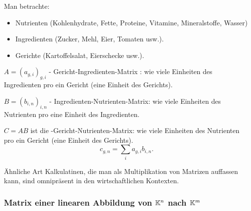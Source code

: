 \begin{bem} 
	Man betrachte: 
	\begin{itemize} 
		\item Nutrienten (Kohlenhydrate, Fette, Proteine, Vitamine, Mineralstoffe, Wasser)
		\item Ingredienten (Zucker, Mehl, Eier, Tomaten usw.). 
		\item Gerichte (Kartoffelsalat, Eierschecke usw.). 
	\end{itemize} 
	
	$A = (a_{g,i})_{g,i}$ - Gericht-Ingredienten-Matrix : wie viele Einheiten des Ingredienten pro ein Gericht (eine Einheit des Gerichts). 
	
	$B = (b_{i,n})_{i,n}$  - Ingredienten-Nutrienten-Matrix: wie viele Einheiten des Nutrienten pro eine Einheit des Ingredienten. 
	
	$C = A B$ ist die -Gericht-Nutrienten-Matrix: wie viele Einheiten des Nutrienten pro ein Gericht (eine Einheit des Gerichts). 
	\[
		c_{g,n} = \sum_{i} a_{g,i} b_{i,n}.
	\]
	
	Ähnliche Art Kalkulatinen, die man als Multiplikation von Matrizen auffassen kann, sind omnipräsent in den wirtschaftlichen Kontexten. 
\end{bem} 

\subsubsection{Matrix einer linearen Abbildung von $ \mathbb K^n $ nach $ \mathbb K^m $}


